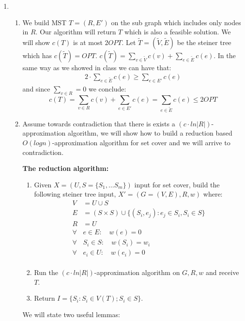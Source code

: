 \documentclass{article}
\begin{document}
\begin{enumerate}
\begin{proof}
\begin{enumerate}[I]
\end{enumerate}	
\end{proof}

\item \begin{enumerate}
	\item We build MST $T = (R,E')$ on the sub graph which includes only nodes in $R$. Our algorithm will return $T$ which is also a feasible solution. We will show $c(T)$ is at most $2OPT$. Let $\tilde T=(\tilde V,\tilde E)$ be the steiner tree which has $c(\tilde T)=OPT$. $c(\tilde T) = \sum_{v\in \tilde V} c(v) + \sum_{e\in \tilde E} c(e)$. In the same way as we showed in class we can have that:
	\begin{align*}
		2 \cdot \sum_{e\in \tilde E} c(e) \ge \sum_{e\in E'} c(e)
	\end{align*}
	 and since $\sum_{v\in R} = 0$ we conclude:
	 $$c(T) = \sum_{v\in R} c(v) + \sum_{e\in E'} c(e) = \sum_{e\in \tilde E} c(e) \le 2OPT$$
	\item Assume towards contradiction that there is exists a $(c\cdot ln |R|)$-approximation algorithm, we will show how to build a reduction based $O(log n)$-approximation algorithm for set cover and we will arrive to contradiction. 
	
\textbf{	The reduction algorithm:}
\begin{enumerate}
	\item
	Given $X =(U,S=\{S_1,\ldots S_m\})$ input for set cover, build the following steiner tree input, $X'=(G=(V,E),R,w)$ where:
	\begin{align*}
	V &= U \cup S\\
	E &= (S\times S) \cup \{(S_i,e_j): e_j\in S_i, S_i\in S\}\\
	R &= U\\
	\forall& e\in E:\quad w(e)=0\\
	\forall& S_i\in S:\quad w(S_i)=w_i\\
	\forall& e_i\in U:\quad w(e_i)=0\\
	\end{align*}
	\item Run the $(c\cdot ln |R|)$-approximation algorithm on $G,R,w$ and receive $T$. 
	\item Return $I = \{S_i : S_i\in V(T); S_i \in S\}$.
\end{enumerate}
We will state two useful lemmas:
		

\end{enumerate}
\end{enumerate}
\end{document}
